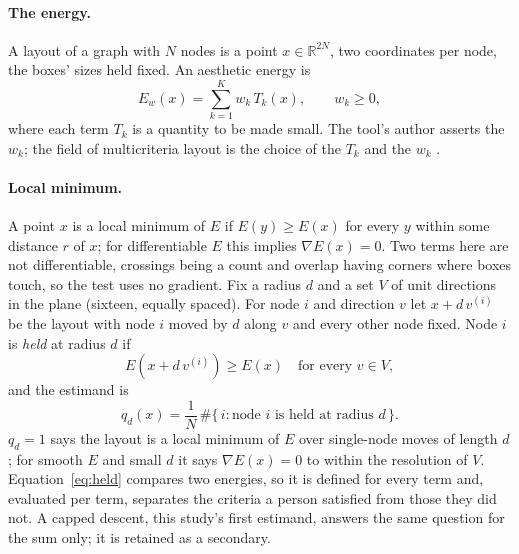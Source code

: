 \documentclass[a4paper,UKenglish]{gd-lipics-v3}
\begin{document}
\paragraph{The energy.} A layout of a graph with $N$ nodes is a point
$x \in \mathbb{R}^{2N}$, two coordinates per node, the boxes' sizes held fixed. An aesthetic
energy is
\begin{equation}
E_w(x) = \sum_{k=1}^{K} w_k\, T_k(x), \qquad w_k \ge 0,
\end{equation}
where each term $T_k$ is a quantity to be made small. The tool's author asserts the
$w_k$; the field of multicriteria layout is the choice of the $T_k$ and the $w_k$
\cite{dh96, purchase02}.

\paragraph{Local minimum.} A point $x$ is a local minimum of $E$ if $E(y) \ge E(x)$ for every $y$
within some distance $r$ of $x$; for differentiable $E$ this implies $\nabla E(x) = 0$. Two
terms here are not differentiable, crossings being a count and overlap having corners where
boxes touch, so the test uses no gradient. Fix a radius $d$ and a set $V$ of unit directions in the plane (sixteen,
equally spaced). For node $i$ and direction $v$ let $x + d\,v^{(i)}$ be the layout with
node $i$ moved by $d$ along $v$ and every other node fixed. Node $i$ is \emph{held} at radius $d$ if
\begin{equation}
E(x + d\,v^{(i)}) \ge E(x) \quad \text{for every } v \in V,
\label{eq:held}
\end{equation}
and the estimand is
\begin{equation}
q_d(x) = \frac{1}{N}\,\#\{\,i : \text{node } i \text{ is held at radius } d\,\}.
\label{eq:q}
\end{equation}
$q_d = 1$ says the layout is a local minimum of $E$ over single-node moves of length $d$;
for smooth $E$ and small $d$ it says $\nabla E(x) = 0$ to within the resolution of $V$.
Equation~\eqref{eq:held} compares two energies, so it is defined for every term and,
evaluated per term, separates the criteria a person satisfied from those they did not. A capped
descent, this study's first estimand, answers the same question for the sum only; it is
retained as a secondary.
\end{document}
